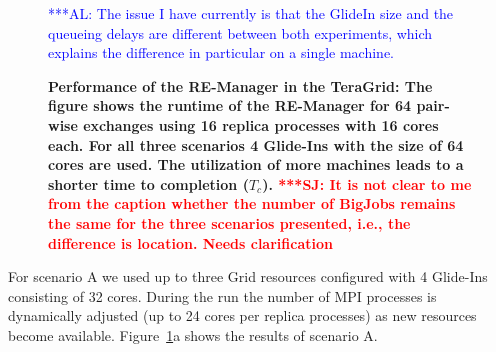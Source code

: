 \documentclass{rspublic}
\newcommand{\alnote}[1]{ {\textcolor{blue} { ***AL: #1 }}}
\newcommand{\jhanote}[1]{ {\textcolor{red} { ***SJ: #1 }}}
\newcommand{\alnote}[1]{}
\newcommand{\jhanote}[1]{}
\begin{document}
{\begin{figure}[t]
    \centering                     
       \caption{\footnotesize \bf Performance of the RE-Manager in the
         TeraGrid: The figure shows the runtime of the RE-Manager for
         64 pair-wise exchanges using 16 replica processes with 16
         cores each. For all three scenarios 4 Glide-Ins with the size
         of 64 cores are used. The utilization of more machines leads to a
         shorter time to completion ($T_{c}$).          
         \jhanote{It is not clear to me from
           the caption whether the number of BigJobs remains the same
           for the three scenarios presented, i.e., the difference is
           location. Needs clarification} }
           \alnote{The issue I have currently is that the GlideIn size and the queueing delays
           are different between both experiments, which explains the difference in particular
           on a single machine. }
    \label{fig:performance_perf_distributed}
\end{figure}
                     
For scenario A we used up to three Grid resources configured with 4 Glide-Ins consisting
of 32 cores. During the run the number of MPI processes is dynamically adjusted (up to 24 cores per
replica processes) as new resources become available.
Figure~\ref{fig:performance_perf_distributed}a shows the results of scenario A.

}
\end{document}
